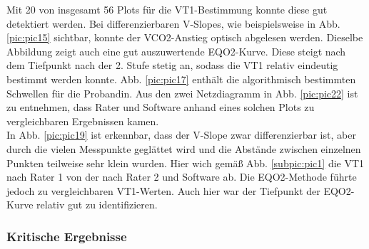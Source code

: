 Mit 20 von insgesamt 56 Plots für die VT1-Bestimmung konnte diese gut detektiert werden. Bei differenzierbaren V-Slopes, wie beispielsweise in Abb. \ref{pic:pic15} sichtbar, konnte der \acs{VCO2}-Anstieg optisch abgelesen werden. Dieselbe Abbildung zeigt auch eine gut auszuwertende \acs{EQO2}-Kurve. Diese steigt nach dem Tiefpunkt nach der 2. Stufe stetig an, sodass die VT1 relativ eindeutig bestimmt werden konnte. Abb. \ref{pic:pic17} enthält die algorithmisch bestimmten Schwellen für die Probandin. Aus den zwei Netzdiagramm in Abb. \ref{pic:pic22} ist zu entnehmen, dass Rater und Software anhand eines solchen Plots zu vergleichbaren Ergebnissen kamen.\\
\clearpage
In Abb. \ref{pic:pic19} ist erkennbar, dass der V-Slope zwar differenzierbar ist, aber durch die vielen Messpunkte geglättet wird und die Abstände zwischen einzelnen Punkten teilweise sehr klein wurden. Hier wich gemäß Abb. \ref{subpic:pic1} die VT1 nach Rater 1 von der nach Rater 2 und Software ab. Die \acs{EQO2}-Methode führte jedoch zu vergleichbaren VT1-Werten. Auch hier war der Tiefpunkt der \acs{EQO2}-Kurve relativ gut zu identifizieren.

\subsubsection{Kritische Ergebnisse}


